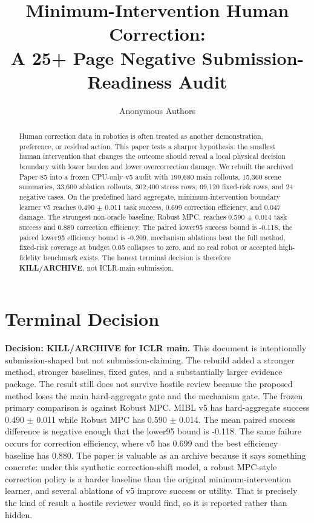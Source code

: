 \documentclass{article}
\title{Minimum-Intervention Human Correction:\\A 25+ Page Negative Submission-Readiness Audit}
\author{Anonymous Authors}
\newcommand{\methodname}{minimum-intervention boundary learner v5}
\begin{document}
\maketitle
\begin{abstract}
Human correction data in robotics is often treated as another demonstration, preference, or residual action. This paper tests a sharper hypothesis: the smallest human intervention that changes the outcome should reveal a local physical decision boundary with lower burden and lower overcorrection damage. We rebuilt the archived Paper 85 into a frozen CPU-only v5 audit with 199,680 main rollouts, 15,360 scene summaries, 33,600 ablation rollouts, 302,400 stress rows, 69,120 fixed-risk rows, and 24 negative cases. On the predefined hard aggregate, \methodname{} reaches 0.490 $\pm$ 0.011 task success, 0.699 correction efficiency, and 0.047 damage. The strongest non-oracle baseline, Robust MPC, reaches 0.590 $\pm$ 0.014 task success and 0.880 correction efficiency. The paired lower95 success bound is -0.118, the paired lower95 efficiency bound is -0.209, mechanism ablations beat the full method, fixed-risk coverage at budget 0.05 collapses to zero, and no real robot or accepted high-fidelity benchmark exists. The honest terminal decision is therefore \textbf{KILL/ARCHIVE}, not ICLR-main submission.
\end{abstract}
\section{Terminal Decision}
\textbf{Decision: KILL/ARCHIVE for ICLR main.} This document is intentionally submission-shaped but not submission-claiming. The rebuild added a stronger method, stronger baselines, fixed gates, and a substantially larger evidence package. The result still does not survive hostile review because the proposed method loses the main hard-aggregate gate and the mechanism gate.
The frozen primary comparison is against Robust MPC. MIBL v5 has hard-aggregate success 0.490 $\pm$ 0.011 while Robust MPC has 0.590 $\pm$ 0.014. The mean paired success difference is negative enough that the lower95 bound is -0.118. The same failure occurs for correction efficiency, where v5 has 0.699 and the best efficiency baseline has 0.880.
The paper is valuable as an archive because it says something concrete: under this synthetic correction-shift model, a robust MPC-style correction policy is a harder baseline than the original minimum-intervention learner, and several ablations of v5 improve success or utility. That is precisely the kind of result a hostile reviewer would find, so it is reported rather than hidden.
\end{document}
